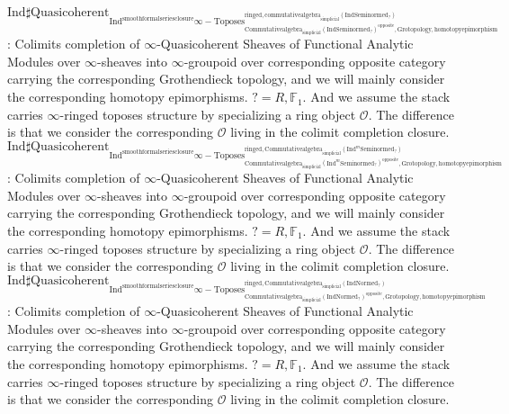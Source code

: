 \documentclass[11pt]{book}
\theoremstyle{definition}
\numberwithin{equation}{section}
\begin{document}
 
 \noindent $\mathrm{Ind}\mathrm{\sharp Quasicoherent}_{\mathrm{Ind}^\text{smoothformalseriesclosure}\infty-\mathrm{Toposes}^{\mathrm{ringed},\mathrm{commutativealgebra}_{\mathrm{simplicial}}(\mathrm{Ind}\mathrm{Seminormed}_?)}_{\mathrm{Commutativealgebra}_{\mathrm{simplicial}}(\mathrm{Ind}\mathrm{Seminormed}_?)^\mathrm{opposite},\mathrm{Grotopology,homotopyepimorphism}}}$: Colimits completion of $\infty$-Quasicoherent Sheaves of Functional Analytic Modules over $\infty$-sheaves into $\infty$-groupoid over corresponding opposite category carrying the corresponding Grothendieck topology, and we will mainly consider the corresponding homotopy epimorphisms. $?=R,\mathbb{F}_1$. And we assume the stack carries $\infty$-ringed toposes structure by specializing a ring object $\mathcal{O}$. The difference is that we consider the corresponding $\mathcal{O}$ living in the colimit completion closure. \\
\noindent $\mathrm{Ind}\mathrm{\sharp Quasicoherent}_{\mathrm{Ind}^\text{smoothformalseriesclosure}\infty-\mathrm{Toposes}^{\mathrm{ringed},\mathrm{Commutativealgebra}_{\mathrm{simplicial}}(\mathrm{Ind}^m\mathrm{Seminormed}_?)}_{\mathrm{Commutativealgebra}_{\mathrm{simplicial}}(\mathrm{Ind}^m\mathrm{Seminormed}_?)^\mathrm{opposite},\mathrm{Grotopology,homotopyepimorphism}}}$: Colimits completion of $\infty$-Quasicoherent Sheaves of Functional Analytic Modules over $\infty$-sheaves into $\infty$-groupoid over corresponding opposite category carrying the corresponding Grothendieck topology, and we will mainly consider the corresponding homotopy epimorphisms. $?=R,\mathbb{F}_1$. And we assume the stack carries $\infty$-ringed toposes structure by specializing a ring object $\mathcal{O}$. The difference is that we consider the corresponding $\mathcal{O}$ living in the colimit completion closure.\\
\noindent $\mathrm{Ind}\mathrm{\sharp Quasicoherent}_{\mathrm{Ind}^\text{smoothformalseriesclosure}\infty-\mathrm{Toposes}^{\mathrm{ringed},\mathrm{Commutativealgebra}_{\mathrm{simplicial}}(\mathrm{Ind}\mathrm{Normed}_?)}_{\mathrm{Commutativealgebra}_{\mathrm{simplicial}}(\mathrm{Ind}\mathrm{Normed}_?)^\mathrm{opposite},\mathrm{Grotopology,homotopyepimorphism}}}$: Colimits completion of $\infty$-Quasicoherent Sheaves of Functional Analytic Modules over $\infty$-sheaves into $\infty$-groupoid over corresponding opposite category carrying the corresponding Grothendieck topology, and we will mainly consider the corresponding homotopy epimorphisms. $?=R,\mathbb{F}_1$. And we assume the stack carries $\infty$-ringed toposes structure by specializing a ring object $\mathcal{O}$. The difference is that we consider the corresponding $\mathcal{O}$ living in the colimit completion closure.\\
\end{document}

